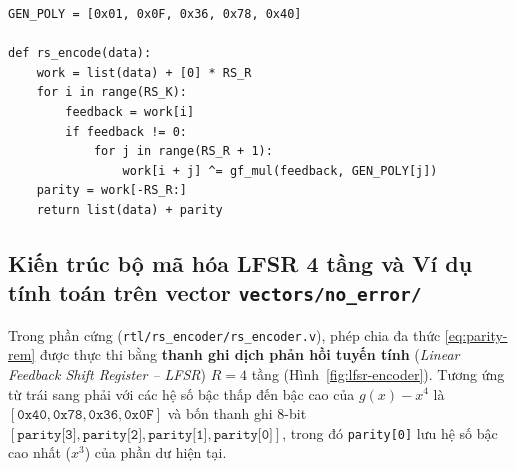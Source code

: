 \documentclass[12pt,a4paper]{report}
\begin{document}
\begin{lstlisting}[style=pythonstyle, caption={Hàm mã hóa systematic \texttt{rs\_encode} trong \texttt{model/rs\_reference.py}}, label={lst:rs-encode}]
GEN_POLY = [0x01, 0x0F, 0x36, 0x78, 0x40]

def rs_encode(data):
    work = list(data) + [0] * RS_R
    for i in range(RS_K):
        feedback = work[i]
        if feedback != 0:
            for j in range(RS_R + 1):
                work[i + j] ^= gf_mul(feedback, GEN_POLY[j])
    parity = work[-RS_R:]
    return list(data) + parity
\end{lstlisting}

\subsection{Kiến trúc bộ mã hóa LFSR 4 tầng và Ví dụ tính toán trên vector \texttt{vectors/no\_error/}}

Trong phần cứng (\texttt{rtl/rs\_encoder/rs\_encoder.v}), phép chia đa thức \eqref{eq:parity-rem} được thực thi bằng \textbf{thanh ghi dịch phản hồi tuyến tính} (\textit{Linear Feedback Shift Register -- LFSR}) $R = 4$ tầng (Hình~\ref{fig:lfsr-encoder}). Tương ứng từ trái sang phải với các hệ số bậc thấp đến bậc cao của $g(x) - x^4$ là $[\texttt{0x40}, \texttt{0x78}, \texttt{0x36}, \texttt{0x0F}]$ và bốn thanh ghi $8$-bit $[\texttt{parity[3]}, \texttt{parity[2]}, \texttt{parity[1]}, \texttt{parity[0]}]$, trong đó \texttt{parity[0]} lưu hệ số bậc cao nhất ($x^3$) của phần dư hiện tại.
\end{document}
